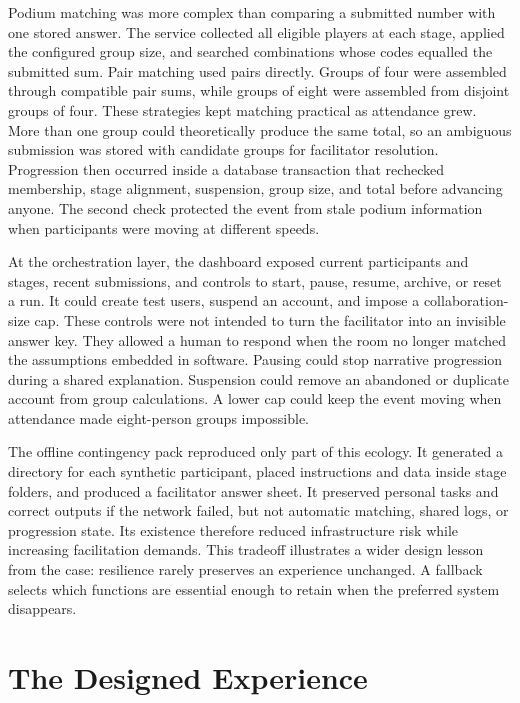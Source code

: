 \documentclass[11pt,a4paper]{article}
\begin{document}
Podium matching was more complex than comparing a submitted number with one stored answer. The service collected all eligible players at each stage, applied the configured group size, and searched combinations whose codes equalled the submitted sum. Pair matching used pairs directly. Groups of four were assembled through compatible pair sums, while groups of eight were assembled from disjoint groups of four. These strategies kept matching practical as attendance grew. More than one group could theoretically produce the same total, so an ambiguous submission was stored with candidate groups for facilitator resolution. Progression then occurred inside a database transaction that rechecked membership, stage alignment, suspension, group size, and total before advancing anyone. The second check protected the event from stale podium information when participants were moving at different speeds.

At the orchestration layer, the dashboard exposed current participants and stages, recent submissions, and controls to start, pause, resume, archive, or reset a run. It could create test users, suspend an account, and impose a collaboration-size cap. These controls were not intended to turn the facilitator into an invisible answer key. They allowed a human to respond when the room no longer matched the assumptions embedded in software. Pausing could stop narrative progression during a shared explanation. Suspension could remove an abandoned or duplicate account from group calculations. A lower cap could keep the event moving when attendance made eight-person groups impossible.

The offline contingency pack reproduced only part of this ecology. It generated a directory for each synthetic participant, placed instructions and data inside stage folders, and produced a facilitator answer sheet. It preserved personal tasks and correct outputs if the network failed, but not automatic matching, shared logs, or progression state. Its existence therefore reduced infrastructure risk while increasing facilitation demands. This tradeoff illustrates a wider design lesson from the case: resilience rarely preserves an experience unchanged. A fallback selects which functions are essential enough to retain when the preferred system disappears.

\section{The Designed Experience}
\end{document}

